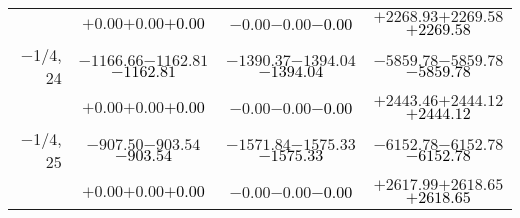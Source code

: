 \documentclass[compress]{beamer}
\begin{document}
\begin{frame}
{\begin{tabular}{r | c | c | c}
           & $+0.00$\hspace{0.1 cm}$+0.00$\hspace{0.1 cm}\textcolor{black}{$+0.00$} & $-0.00$\hspace{0.1 cm}$-0.00$\hspace{0.1 cm}\textcolor{black}{$-0.00$} & $+2268.93$\hspace{0.1 cm}$+2269.58$\hspace{0.1 cm}\textcolor{black}{$+2269.58$} \\
$-$1/4, 24 & $-1166.66$\hspace{0.1 cm}$-1162.81$\hspace{0.1 cm}\textcolor{black}{$-1162.81$} & $-1390.37$\hspace{0.1 cm}$-1394.04$\hspace{0.1 cm}\textcolor{black}{$-1394.04$} & $-5859.78$\hspace{0.1 cm}$-5859.78$\hspace{0.1 cm}\textcolor{black}{$-5859.78$} \\
           & $+0.00$\hspace{0.1 cm}$+0.00$\hspace{0.1 cm}\textcolor{black}{$+0.00$} & $-0.00$\hspace{0.1 cm}$-0.00$\hspace{0.1 cm}\textcolor{black}{$-0.00$} & $+2443.46$\hspace{0.1 cm}$+2444.12$\hspace{0.1 cm}\textcolor{black}{$+2444.12$} \\
$-$1/4, 25 & $-907.50$\hspace{0.1 cm}$-903.54$\hspace{0.1 cm}\textcolor{black}{$-903.54$} & $-1571.84$\hspace{0.1 cm}$-1575.33$\hspace{0.1 cm}\textcolor{black}{$-1575.33$} & $-6152.78$\hspace{0.1 cm}$-6152.78$\hspace{0.1 cm}\textcolor{black}{$-6152.78$} \\
           & $+0.00$\hspace{0.1 cm}$+0.00$\hspace{0.1 cm}\textcolor{black}{$+0.00$} & $-0.00$\hspace{0.1 cm}$-0.00$\hspace{0.1 cm}\textcolor{black}{$-0.00$} & $+2617.99$\hspace{0.1 cm}$+2618.65$\hspace{0.1 cm}\textcolor{black}{$+2618.65$} \\

\end{tabular}}
\end{frame}
\end{document}
